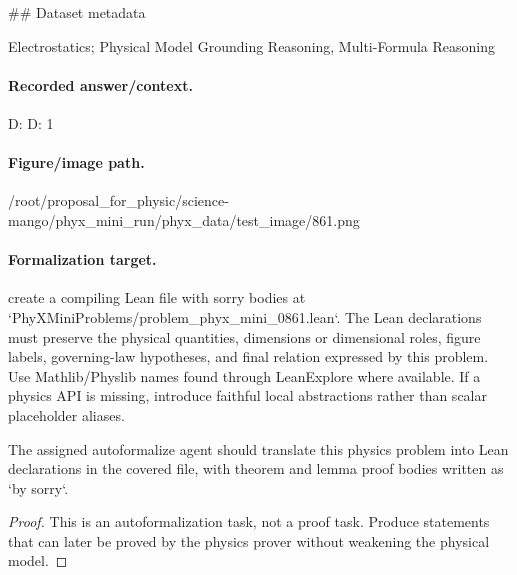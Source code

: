 \#\# Dataset metadata

Electrostatics; Physical Model Grounding Reasoning, Multi-Formula Reasoning

\paragraph{Recorded answer/context.}
D: D: 1

\paragraph{Figure/image path.}
/root/proposal\_for\_physic/science-mango/phyx\_mini\_run/phyx\_data/test\_image/861.png

\paragraph{Formalization target.}
create a compiling Lean file with sorry bodies at `PhyXMiniProblems/problem\_phyx\_mini\_0861.lean`. The Lean declarations must preserve the physical quantities, dimensions or dimensional roles, figure labels, governing-law hypotheses, and final relation expressed by this problem.
Use Mathlib/Physlib names found through LeanExplore where available. If a physics API is missing, introduce faithful local abstractions rather than scalar placeholder aliases.

\begin{theorem}
\label{thm:physics:phyx_mini_0861:target}
The assigned autoformalize agent should translate this physics problem into Lean declarations in the covered file, with theorem and lemma proof bodies written as `by sorry`.
\end{theorem}
\begin{proof}
This is an autoformalization task, not a proof task. Produce statements that can later be proved by the physics prover without weakening the physical model.
\end{proof}


